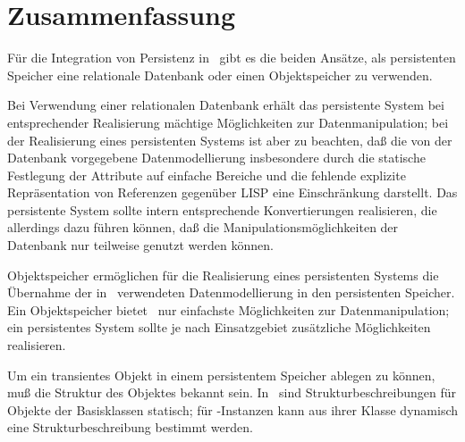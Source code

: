 \section{Zusammenfassung}
%
F\"{u}r die Integration von Persistenz in \clos\ gibt es die beiden
Ans\"{a}tze, als persistenten Speicher eine relationale Datenbank oder
einen Objektspeicher zu verwenden.
%
\par{}Bei Verwendung einer relationalen Datenbank erh\"{a}lt das
persistente System bei entsprechender Realisierung m\"{a}chtige
M\"{o}glichkeiten zur Datenmanipulation; bei der Realisierung eines
persistenten Systems ist aber zu beachten, da\ss{} die von der Datenbank
vorgegebene Datenmodellierung insbesondere durch die statische
Festlegung der Attribute auf einfache Bereiche und die fehlende
explizite Repr\"{a}sentation von Referenzen gegen\"{u}ber LISP eine
Einschr\"{a}nkung darstellt. Das persistente System sollte intern
entsprechende Konvertierungen realisieren, die allerdings dazu f\"{u}hren
k\"{o}nnen, da\ss{} die Manipulationsm\"{o}glichkeiten der Datenbank nur
teilweise genutzt werden k\"{o}nnen.
%
\par{}Objektspeicher erm\"{o}glichen f\"{u}r die Realisierung eines
persistenten Systems die \"{U}bernahme der in \cl\ verwendeten
Datenmodellierung in den persistenten Speicher. Ein Objektspeicher
bietet \ia\ nur einfachste M\"{o}glichkeiten zur Datenmanipulation; ein
persistentes System sollte je nach Einsatzgebiet zus\"{a}tzliche
M\"{o}glichkeiten realisieren.
%
\par{}Um ein transientes Objekt in einem persistentem Speicher ablegen
zu k\"{o}nnen, mu\ss{} die Struktur des Objektes bekannt sein. In \cl\ sind
Strukturbeschreibungen f\"{u}r Objekte der Basisklassen statisch;
f\"{u}r \clos-Instanzen kann aus ihrer Klasse dynamisch eine
Strukturbeschreibung bestimmt werden.


